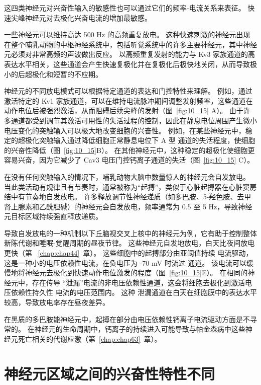 这四类神经元对兴奋性输入的敏感性也可以通过它们的频率-电流关系来表征。
快速尖峰神经元对去极化兴奋电流的增加最敏感。


一些神经元可以维持高达 500 Hz 的高频重复放电。
这种快速刺激的神经元出现在整个哺乳动物的中枢神经系统中，包括听觉系统中的许多主要神经元，其中神经元必须对非常高频的声波做出反应。
以高频重复发射的能力与 Kv3 家族通道的高表达水平相关，这些通道会产生快速复极化并在复极化后极快地关闭，从而导致极小的后超极化和短暂的不应期。


神经元的不同放电模式可以根据特定通道的表达和门控特性来理解。
例如，通过激活特定的 Kv1 家族通道，可以在维持电流脉冲期间调整发射频率，这些通道在动作电位后被强烈激活，从而阻碍后续尖峰的发射（图~\ref{fig:10_15} A）。
由于许多通道都受到调节其激活可用性的失活过程的控制，因此在静息电位周围产生微小电压变化的突触输入可以极大地改变细胞的兴奋性。
例如，在某些神经元中，稳定的超极化突触输入通过降低细胞正常静息电位下 A 型  通道的失活程度，使细胞的兴奋性降低（图~\ref{fig:10_15}B）。 
在其他神经元中，这种稳定的超极化使细胞更容易兴奋，因为它减少了 Cav3 电压门控钙离子通道的失活（图~\ref{fig:10_15} C）。


在没有任何突触输入的情况下，哺乳动物大脑中数量惊人的神经元会自发放电。
当此类活动有规律且有节奏时，通常被称为“起搏”，类似于心脏起搏器在心脏窦房结中有节奏地自发放电。
许多释放调节性神经递质（如多巴胺、5-羟色胺、去甲肾上腺素和乙酰胆碱）的神经元会自发放电，频率通常为 0.5 至 5 Hz，导致神经元目标区域持续强直释放递质。


导致自发放电的一种机制以下丘脑视交叉上核中的神经元为例，它有助于控制整体新陈代谢和睡眠-觉醒周期的昼夜节律。
这些神经元自发地放电，白天比夜间放电更快（第 ~\ref{chap:chap44}~章）。 
这些细胞中的起搏部分由亚阈值持续  电流驱动，这是一种小的电压依赖性电流，在负电压为 -70 mV 时流过  通道。
该电流可以缓慢地将神经元去极化到快速动作电位激发的程度（图~\ref{fig:10_15}E）。
在相同的神经元中，存在传导 “泄漏”电流的非电压依赖性通道，这会将细胞去极化到激活电压依赖性持久性  电流的电压范围内。
这种  泄漏通道在白天在细胞膜中的表达水平较高，导致放电率存在昼夜差异。


在黑质的多巴胺能神经元中，起搏在部分由电压依赖性钙离子电流驱动方面是不寻常的。
在神经元的生命周期中，钙离子的持续进入可能导致与帕金森病中这些神经元死亡相关的代谢应激（第~\ref{chap:chap63}~章）。



\section{神经元区域之间的兴奋性特性不同}

